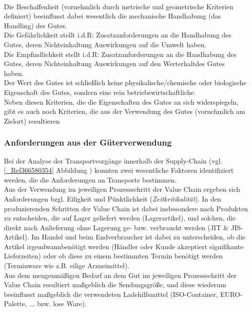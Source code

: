 \begin{figure}[htbp]
  \centering
  \caption{}
  \label{}
\end{figure}
~\\
Die Beschaffenheit (vornehmlich durch metrische und geometrische Kriterien definiert) beeinflusst dabei wesentlich die mechanische Handhabung (das \glqq Handling\grqq ) des Gutes.~\\
Die Gefährlichkeit stellt i.d.R: Zusatzanforderungen an die Handhabung des Gutes, deren Nichteinhaltung Auswirkungen auf die Umwelt haben.~\\
Die Empfindlichkeit stellt i.d.R: Zusatzanforderungen an die Handhabung des Gutes, deren Nichteinhaltung Auswirkungen auf den \glqq Werterhalt\grqq  des Gutes haben.~\\
Der Wert des Gutes ist schließlich keine physikalische/chemische oder biologische Eigenschaft des Gutes, sondern eine rein betriebswirtschaftliche.~\\
Neben diesen Kriterien, die die Eigenschaften des Gutes an sich widerspiegeln, gibt es auch noch Kriterien, die aus der Verwendung des Gutes (vornehmlich am Zielort) resultieren~\\


% 
\subsubsection{Anforderungen aus der Güterverwendung}
\label{_Toc366766110}
\label{_Toc366775304}
Bei der Analyse der Transportvorgänge innerhalb der Supply-Chain (vgl. \autoref{_Ref366580354} Abbildung ) konnten zwei wesentliche Faktoren identifiziert werden, die die Anforderungen an Transporte bestimmen.~\\
Aus der Verwendung im jeweiligen Prozessschritt der Value Chain ergeben sich Anforderungen bzgl. Eiligkeit und Pünktlichkeit (\emph{Zeitkritikalität}). In den produzierenden Schritten der Value Chain ist dabei insbesondere nach Produkten zu entscheiden, die auf Lager geliefert werden (Lagerartikel), und solchen, die direkt nach Anlieferung ohne Lagerung ge- bzw. verbraucht werden (JIT \& JIS-Artikel). Im Handel und beim Endverbraucher ist dabei zu unterscheiden, ob die Artikel \glqq irgendwann\grqq  benötigt werden (Händler oder Kunde akzeptiert signifikante Lieferzeiten) oder ob diese zu einem bestimmten Termin benötigt werden (Terminware wie z.B. eilige Arzneimittel).~\\
Aus dem mengenmäßigen Bedarf an dem Gut im jeweiligen Prozessschritt der Value Chain resultiert maßgeblich die Sendungsgröße, und diese wiederum beeinflusst maßgeblich die verwendeten Ladehilfsmittel (ISO-Container, EURO-Palette, $\ldots$ bzw. lose Ware).~\\


